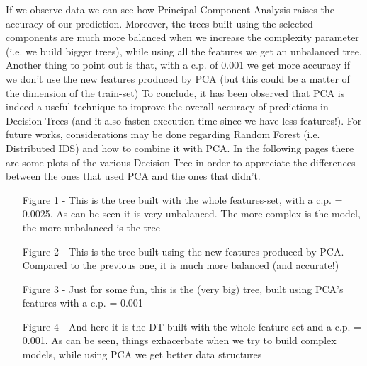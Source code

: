 \vspace{0.3cm}

If we observe data we can see how Principal Component Analysis raises the accuracy of our prediction. Moreover, the trees built using the selected components are much more balanced when we increase the complexity parameter (i.e. we build bigger trees), while using all the features we get an unbalanced tree.\newline\newline
Another thing to point out is that, with a c.p. of 0.001 we get more accuracy if we don't use the new features produced by PCA (but this could be a matter of the dimension of the train-set)\newline\newline
To conclude, it has been observed that PCA is indeed a useful technique to improve the overall accuracy of predictions in Decision Trees (and it also fasten execution time since we have less features!). For future works, considerations may be done regarding Random Forest (i.e. Distributed IDS) and how to combine it with PCA.\newline\newline
\clearpage
In the following pages there are some plots of the various Decision Tree in order to appreciate the differences between the ones that used PCA and the ones that didn't.
\vspace{2cm}

\begin{itemize}


	\item[Figure 1 - ]This is the tree built with the whole features-set, with a c.p. = 0.0025. As can be seen it is very unbalanced. The more complex is the model, the more unbalanced is the tree


	\item[Figure 2 - ]This is the tree built using the new features produced by PCA. Compared to the previous one, it is much more balanced (and accurate!)


	\item[Figure 3 - ]Just for some fun, this is the (very big) tree, built using PCA's features with a c.p. = 0.001


	\item[Figure 4 - ]And here it is the DT built with the whole feature-set and a c.p. = 0.001. As can be seen, things exhacerbate when we try to build complex models, while using PCA we get better data structures	
\end{itemize}

